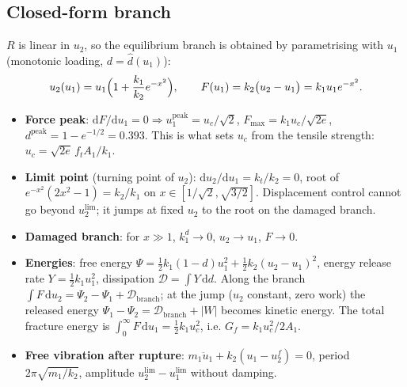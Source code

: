 \documentclass[11pt,a4paper]{article}
\newcommand{\dd}{\mathrm{d}}
\newcommand{\kd}{k_1^{d}}
\begin{document}
\subsection{Closed-form branch}
$R$ is linear in $u_2$, so the equilibrium branch is obtained by parametrising with $u_1$
(monotonic loading, $d = \hat d(u_1)$):
\begin{equation}
  u_2(u_1) = u_1\Bigl(1+\frac{k_1}{k_2}e^{-x^2}\Bigr),\qquad
  F(u_1) = k_2\bigl(u_2-u_1\bigr) = k_1u_1e^{-x^2}.
  \label{eq:branch}
\end{equation}
\begin{itemize}
  \item \textbf{Force peak}: $\dd F/\dd u_1 = 0 \Rightarrow u_1^{\text{peak}} = u_c/\sqrt2$,
        $F_{\max} = k_1u_c/\sqrt{2e}$, $d^{\text{peak}} = 1-e^{-1/2} = 0.393$. This is what sets
        $u_c$ from the tensile strength: $u_c = \sqrt{2e}\,f_tA_1/k_1$.
  \item \textbf{Limit point} (turning point of $u_2$): $\dd u_2/\dd u_1 = k_t/k_2 = 0$, root of
        $e^{-x^2}(2x^2-1) = k_2/k_1$ on $x\in[1/\sqrt2,\sqrt{3/2}]$. Displacement control cannot go
        beyond $u_2^{\lim}$; it jumps at fixed $u_2$ to the root on the damaged branch.
  \item \textbf{Damaged branch}: for $x\gg1$, $\kd\to0$, $u_2\to u_1$, $F\to0$.
  \item \textbf{Energies}: free energy $\Psi = \tfrac12k_1(1-d)u_1^2 + \tfrac12k_2(u_2-u_1)^2$,
        energy release rate $Y = \tfrac12k_1u_1^2$, dissipation $\mathcal D = \int Y\,\dd d$.
        Along the branch $\int F\,\dd u_2 = \Psi_2-\Psi_1+\mathcal D_{\text{branch}}$; at the jump
        ($u_2$ constant, zero work) the released energy $\Psi_1-\Psi_2 = \mathcal D_{\text{branch}}+|W|$
        becomes kinetic energy. The total fracture energy is
        $\int_0^\infty F\,\dd u_1 = \tfrac12k_1u_c^2$, i.e. $G_f = k_1u_c^2/2A_1$.
  \item \textbf{Free vibration after rupture}: $m_1\ddot u_1 + k_2(u_1-u_2^f) = 0$, period
        $2\pi\sqrt{m_1/k_2}$, amplitude $u_2^{\lim}-u_1^{\lim}$ without damping.
\end{itemize}
\end{document}
